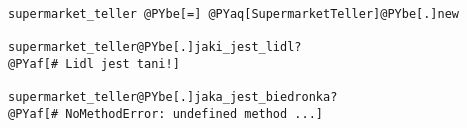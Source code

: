 \begin{Verbatim}[commandchars=@\[\]]
supermarket_teller @PYbe[=] @PYaq[SupermarketTeller]@PYbe[.]new

supermarket_teller@PYbe[.]jaki_jest_lidl?
@PYaf[# Lidl jest tani!]

supermarket_teller@PYbe[.]jaka_jest_biedronka?
@PYaf[# NoMethodError: undefined method ...]
\end{Verbatim}
